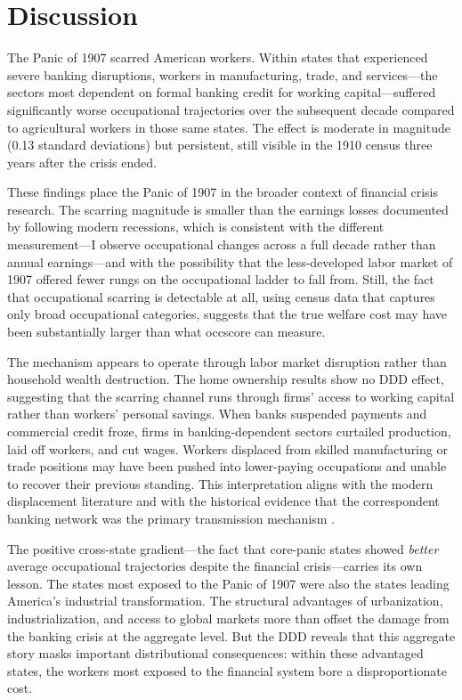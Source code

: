 \documentclass[12pt]{article}
\begin{document}
\section{Discussion}

The Panic of 1907 scarred American workers. Within states that experienced severe banking disruptions, workers in manufacturing, trade, and services---the sectors most dependent on formal banking credit for working capital---suffered significantly worse occupational trajectories over the subsequent decade compared to agricultural workers in those same states. The effect is moderate in magnitude (0.13 standard deviations) but persistent, still visible in the 1910 census three years after the crisis ended.

These findings place the Panic of 1907 in the broader context of financial crisis research. The scarring magnitude is smaller than the earnings losses documented by \citet{davis2011recessions} following modern recessions, which is consistent with the different measurement---I observe occupational changes across a full decade rather than annual earnings---and with the possibility that the less-developed labor market of 1907 offered fewer rungs on the occupational ladder to fall from. Still, the fact that occupational scarring is detectable at all, using census data that captures only broad occupational categories, suggests that the true welfare cost may have been substantially larger than what occscore can measure.

The mechanism appears to operate through labor market disruption rather than household wealth destruction. The home ownership results show no DDD effect, suggesting that the scarring channel runs through firms' access to working capital rather than workers' personal savings. When banks suspended payments and commercial credit froze, firms in banking-dependent sectors curtailed production, laid off workers, and cut wages. Workers displaced from skilled manufacturing or trade positions may have been pushed into lower-paying occupations and unable to recover their previous standing. This interpretation aligns with the modern displacement literature \citep{jacobson1993earnings, kroft2016long} and with the historical evidence that the correspondent banking network was the primary transmission mechanism \citep{frydman2023panic}.

The positive cross-state gradient---the fact that core-panic states showed \textit{better} average occupational trajectories despite the financial crisis---carries its own lesson. The states most exposed to the Panic of 1907 were also the states leading America's industrial transformation. The structural advantages of urbanization, industrialization, and access to global markets more than offset the damage from the banking crisis at the aggregate level. But the DDD reveals that this aggregate story masks important distributional consequences: within these advantaged states, the workers most exposed to the financial system bore a disproportionate cost.
\end{document}
